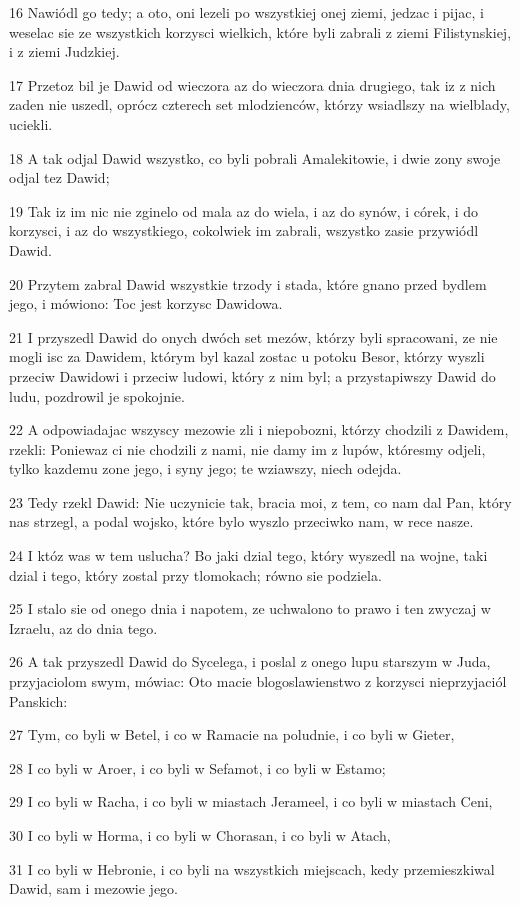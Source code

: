 \par 16 Nawiódl go tedy; a oto, oni lezeli po wszystkiej onej ziemi, jedzac i pijac, i weselac sie ze wszystkich korzysci wielkich, które byli zabrali z ziemi Filistynskiej, i z ziemi Judzkiej.
\par 17 Przetoz bil je Dawid od wieczora az do wieczora dnia drugiego, tak iz z nich zaden nie uszedl, oprócz czterech set mlodzienców, którzy wsiadlszy na wielblady, uciekli.
\par 18 A tak odjal Dawid wszystko, co byli pobrali Amalekitowie, i dwie zony swoje odjal tez Dawid;
\par 19 Tak iz im nic nie zginelo od mala az do wiela, i az do synów, i córek, i do korzysci, i az do wszystkiego, cokolwiek im zabrali, wszystko zasie przywiódl Dawid.
\par 20 Przytem zabral Dawid wszystkie trzody i stada, które gnano przed bydlem jego, i mówiono: Toc jest korzysc Dawidowa.
\par 21 I przyszedl Dawid do onych dwóch set mezów, którzy byli spracowani, ze nie mogli isc za Dawidem, którym byl kazal zostac u potoku Besor, którzy wyszli przeciw Dawidowi i przeciw ludowi, który z nim byl; a przystapiwszy Dawid do ludu, pozdrowil je spokojnie.
\par 22 A odpowiadajac wszyscy mezowie zli i niepobozni, którzy chodzili z Dawidem, rzekli: Poniewaz ci nie chodzili z nami, nie damy im z lupów, któresmy odjeli, tylko kazdemu zone jego, i syny jego; te wziawszy, niech odejda.
\par 23 Tedy rzekl Dawid: Nie uczynicie tak, bracia moi, z tem, co nam dal Pan, który nas strzegl, a podal wojsko, które bylo wyszlo przeciwko nam, w rece nasze.
\par 24 I któz was w tem uslucha? Bo jaki dzial tego, który wyszedl na wojne, taki dzial i tego, który zostal przy tlomokach; równo sie podziela.
\par 25 I stalo sie od onego dnia i napotem, ze uchwalono to prawo i ten zwyczaj w Izraelu, az do dnia tego.
\par 26 A tak przyszedl Dawid do Sycelega, i poslal z onego lupu starszym w Juda, przyjaciolom swym, mówiac: Oto macie blogoslawienstwo z korzysci nieprzyjaciól Panskich:
\par 27 Tym, co byli w Betel, i co w Ramacie na poludnie, i co byli w Gieter,
\par 28 I co byli w Aroer, i co byli w Sefamot, i co byli w Estamo;
\par 29 I co byli w Racha, i co byli w miastach Jerameel, i co byli w miastach Ceni,
\par 30 I co byli w Horma, i co byli w Chorasan, i co byli w Atach,
\par 31 I co byli w Hebronie, i co byli na wszystkich miejscach, kedy przemieszkiwal Dawid, sam i mezowie jego.

